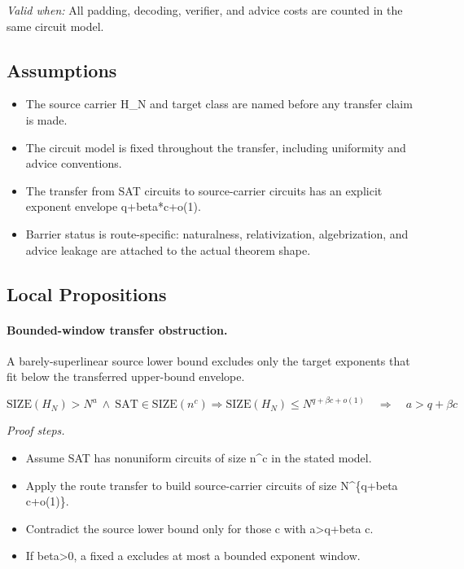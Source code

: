 \emph{Valid when:} All padding, decoding, verifier, and advice costs are counted in the same circuit model.

\subsection{Assumptions}

\begin{itemize}
\item The source carrier H\_N and target class are named before any transfer claim is made.
\item The circuit model is fixed throughout the transfer, including uniformity and advice conventions.
\item The transfer from SAT circuits to source-carrier circuits has an explicit exponent envelope q+beta*c+o(1).
\item Barrier status is route-specific: naturalness, relativization, algebrization, and advice leakage are attached to the actual theorem shape.
\end{itemize}

\subsection{Local Propositions}

\paragraph{Bounded-window transfer obstruction.} A barely-superlinear source lower bound excludes only the target exponents that fit below the transferred upper-bound envelope.

\[
\mathrm{SIZE}(H_N)>N^a\ \wedge\ \mathrm{SAT}\in\mathrm{SIZE}(n^c)\Rightarrow \mathrm{SIZE}(H_N)\le N^{q+\beta c+o(1)}\quad\Longrightarrow\quad a>q+\beta c
\]

\emph{Proof steps.}

\begin{itemize}
\item Assume SAT has nonuniform circuits of size n\textasciicircum{}c in the stated model.
\item Apply the route transfer to build source-carrier circuits of size N\textasciicircum{}\{q+beta c+o(1)\}.
\item Contradict the source lower bound only for those c with a>q+beta c.
\item If beta>0, a fixed a excludes at most a bounded exponent window.
\end{itemize}

